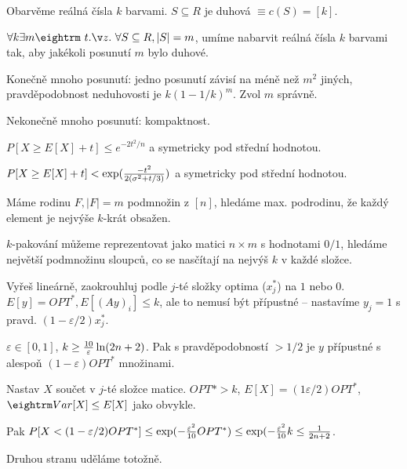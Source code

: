 \dfn{} Obarvěme reálná čísla $k$ barvami. $S \subseteq R$ je {\I duhová} $\equiv c(S) = [k]$.

\thm{} $\forall k \exists m \st \forall S \subseteq R, |S|=m$, umíme nabarvit
reálná čísla $k$ barvami tak, aby jakékoli posunutí $m$ bylo duhové.

\prf{} Konečně mnoho posunutí: jedno posunutí závisí na méně než $m^2$ jiných, 
pravděpodobnost neduhovosti je $k(1-1/k)^m$. Zvol $m$ správně.

Nekonečně mnoho posunutí: kompaktnost.






 $P[X \ge E[X] + t] \le e^{-2t^2/n}$ a
symetricky pod střední hodnotou.

 $P[X \ge E[X] + t] < \exp({-t^2 \over
2(\sigma^2 + t/3)})$ a symetricky pod střední hodnotou.

 Máme rodinu $F, |F|=m$ podmnožin z $[n]$, hledáme max. podrodinu, že
každý element je nejvýše $k$-krát obsažen. 

$k$-pakování můžeme reprezentovat jako matici $n \times m$ s hodnotami $0/1$,
hledáme největší podmnožinu sloupců, co se nasčítají na nejvýš $k$ v každé
složce.

Vyřeš lineárně, zaokrouhluj podle $j$-té složky optima ($x^{*}_j$) na $1$ nebo $0$.
$E[y] = OPT^{*}, E[(Ay)_i] \le k$, ale to nemusí být přípustné -- nastavíme $y_j = 1$
s pravd. $(1 - \varepsilon/2) x^{*}_j$. 

\thm{} $\varepsilon \in [0,1]$, $k \ge {10 \over \varepsilon} \ln(2n+2)$. Pak s pravděpodobností
$> 1/2$ je $y$ přípustné s alespoň $(1-\varepsilon) OPT^*$ množinami.

\prf{} Nastav $X$ součet v $j$-té složce matice. $OPT* > k$, $E[X] = (1
\varepsilon/2) OPT^*$, $\var[X] \le E[X]$ jako obvykle.

Pak $P[X < (1 - \varepsilon/2)OPT^*] \le \exp(-{\varepsilon^2 \over 10} OPT^*)
\le \exp(-{\varepsilon^2 \over 10}k \le {1 \over 2n+2}$.

Druhou stranu uděláme totožně.

\bye
